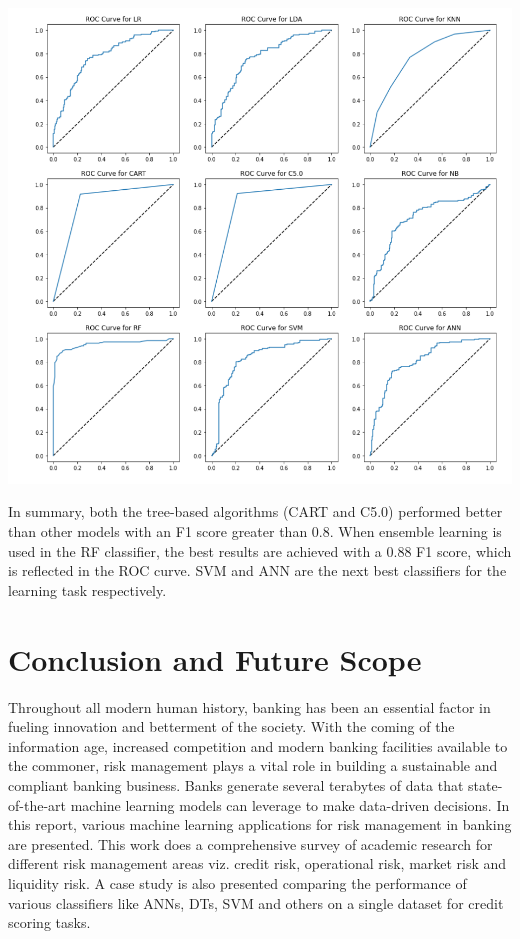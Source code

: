\documentclass[a4paper, 12pt]{article}
\begin{document}
\begin{center}
\includegraphics[scale=0.7]{roc.png}
\label{fig:roc}
\end{center}

\noindent In summary, both the tree-based algorithms (CART and C5.0) performed better than other models with an F1 score greater than 0.8. When ensemble learning is used in the RF classifier, the best results are achieved with a 0.88 F1 score, which is reflected in the ROC curve. SVM and ANN are the next best classifiers for the learning task respectively.

\newpage
\section{\centering Conclusion and Future Scope}
\vskip 0.25in
Throughout all modern human history, banking has been an essential factor in fueling innovation and betterment of the society. With the coming of the information age, increased competition and modern banking facilities available to the commoner, risk management plays a vital role in building a sustainable and compliant banking business. Banks generate several terabytes of data that state-of-the-art machine learning models can leverage to make data-driven decisions. In this report, various machine learning applications for risk management in banking are presented. This work does a comprehensive survey of academic research for different risk management areas viz. credit risk, operational risk, market risk and liquidity risk. A case study is also presented comparing the performance of various classifiers like ANNs, DTs, SVM and others on a single dataset for credit scoring tasks.
\end{document}
